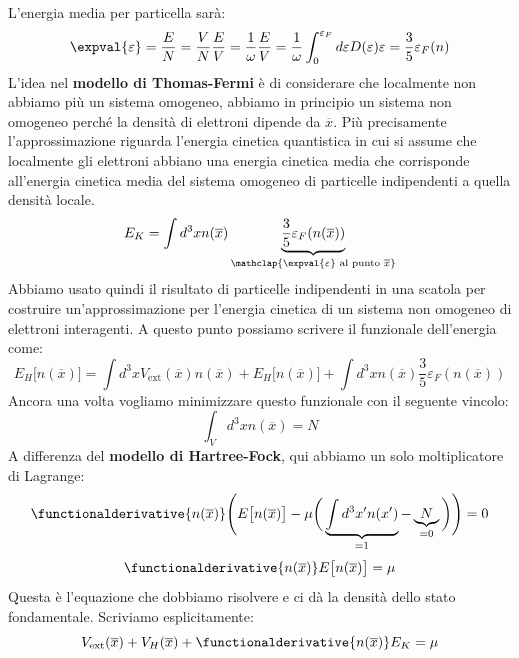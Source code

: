 L'energia media per particella sarà:
\begin{equation*}
    \expval{\varepsilon}=\frac EN=\frac VN \frac EV = \frac 1\omega\frac EV=\frac 1\omega\int_{0}^{\varepsilon_F}d\varepsilon D(\varepsilon)\varepsilon = \frac 3 5 \varepsilon_F(n)
\end{equation*}
L'idea nel \textbf{modello di Thomas-Fermi} è di considerare che localmente non abbiamo più un sistema omogeneo, abbiamo in principio un sistema non omogeneo perché la densità di elettroni dipende da $\overline x$. Più precisamente l'approssimazione riguarda l'energia cinetica quantistica in cui si assume che localmente gli elettroni abbiano una energia cinetica media che corrisponde all'energia cinetica media del sistema omogeneo di particelle indipendenti a quella densità locale.
\begin{equation*}
    E_K=\int d^3xn(\overline x)\underbrace{\frac 35 \varepsilon_F(n(\overline x))}_{\mathclap{\expval{\varepsilon} \text{ al punto } \overline x}}
\end{equation*}
Abbiamo usato quindi il risultato di particelle indipendenti in una scatola per costruire un'approssimazione per l'energia cinetica di un sistema non omogeneo di elettroni interagenti. A questo punto possiamo scrivere il funzionale dell'energia come:
\begin{equation*}
    E_H\big[n(\overline x)\big]=\int d^3x V_{\text{ext}}(\overline x)n(\overline x)+E_H\big[n(\overline x)\big]+\int d^3xn(\overline x)\frac 35\varepsilon_F(n(\overline x))
\end{equation*}
Ancora una volta vogliamo minimizzare questo funzionale con il seguente vincolo:
\begin{equation*}
    \int_Vd^3x n(\overline x)=N
\end{equation*}
A differenza del \textbf{modello di Hartree-Fock}, qui abbiamo un solo moltiplicatore di Lagrange:
\begin{equation*}
    \functionalderivative{n(\overline x)}\Bigg(E\big[n(\overline x)\big]-\mu\bigg(\underbrace{\int d^3x'n(x')}_{=1}-\underbrace{N}_{=0}\bigg)\Bigg)=0
\end{equation*}
\begin{equation*}
    \functionalderivative{n(\overline x)}E\big[n(\overline x)\big]=\mu
\end{equation*}
Questa è l'equazione che dobbiamo risolvere e ci dà la densità dello stato fondamentale. Scriviamo esplicitamente:
\begin{equation*}
    V_{\text {ext}}(\overline x)+V_H(\overline x) + \functionalderivative{n(\overline x)}E_{K}=\mu
\end{equation*}
